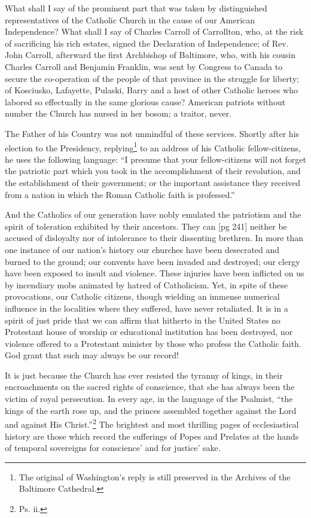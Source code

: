 What shall I say of the prominent part that was
taken by distinguished representatives of the Catholic
Church in the cause of our American Independence?
What shall I say of Charles Carroll of
Carrollton, who, at the risk of sacrificing his rich
estates, signed the Declaration of Independence;
of Rev. John Carroll, afterward the first Archbishop
of Baltimore, who, with his cousin Charles
Carroll and Benjamin Franklin, was sent by Congress
to Canada to secure the co-operation of the
people of that province in the struggle for liberty;
of Kosciusko, Lafayette, Pulaski, Barry and a host
of other Catholic heroes who labored so effectually
in the same glorious cause? American patriots
without number the Church has nursed in her
bosom; a traitor, never.

The Father of his Country was not unmindful of
these services. Shortly after his election to the
Presidency, replying\footnote{The original
of Washington's reply is still preserved in the
Archives of the Baltimore Cathedral.} to an address of his Catholic
fellow-citizens, he uses the following language: “I
presume that your fellow-citizens will not forget
the patriotic part which you took in the accomplishment
of their revolution, and the establishment
of their government; or the important assistance
they received from a nation in which the Roman
Catholic faith is professed.”

And the Catholics of our generation have nobly
emulated the patriotism and the spirit of toleration
exhibited by their ancestors. They can
[pg 241]
neither be accused of disloyalty nor of intolerance
to their dissenting brethren. In more than one
instance of our nation's history our churches
have been desecrated and burned to the ground;
our convents have been invaded and destroyed;
our clergy have been exposed to insult and
violence. These injuries have been inflicted on
us by incendiary mobs animated by hatred of
Catholicism. Yet, in spite of these provocations,
our Catholic citizens, though wielding an immense
numerical influence in the localities where they
suffered, have never retaliated. It is in a spirit
of just pride that we can affirm that hitherto in
the United States no Protestant house of worship
or educational institution has been destroyed, nor
violence offered to a Protestant minister by those
who profess the Catholic faith. God grant that
such may always be our record!

It is just because the Church has ever resisted
the tyranny of kings, in their encroachments on
the sacred rights of conscience, that she has always
been the victim of royal persecution. In
every age, in the language of the Psalmist, “the
kings of the earth rose up, and the princes assembled
together against the Lord and against
His Christ.”\footnote{Ps.
ii.} The brightest and most thrilling
pages of ecclesiastical history are those which
record the sufferings of Popes and Prelates at
the hands of temporal sovereigns for conscience'
and for justice' sake.

